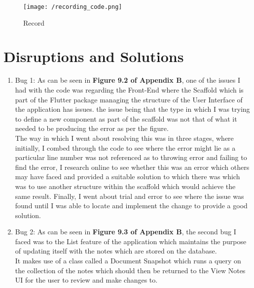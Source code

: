 \documentclass[oneside]{report}
\begin{document}
		\begin{figure}[H]
			\begin{center}
	 		 	\texttt{[image: /recording\_code.png]}
			\end{center}
			\caption[Record]{Record}
		\end{figure}


	\section{Disruptions and Solutions}
		 \begin{enumerate}
			\item Bug 1: As can be seen in \textbf{Figure 9.2 of Appendix B}, one of the issues I had with the code was regarding the Front-End where the Scaffold which is part of the Flutter package managing the structure of the User Interface of the application has issues. the issue being that the type in which I was trying to define a new component as part of the scaffold was not that of what it needed to be producing the error as per the figure.\\

The way in which I went about resolving this was in three stages, where initially, I combed through the code to see where the error might lie as a particular line number was not referenced as to throwing error and failing to find the error, I research online to see whether this was an error which others may have faced and provided a suitable solution to which there was which was to use another structure within the scaffold which would achieve the same result. Finally, I went about trial and error to see where the issue was found until I was able to locate and implement the change to provide a good solution.

		 	\item Bug 2: As can be seen in \textbf{Figure 9.3 of Appendix B}, the second bug I faced was to the List feature of the application which maintains the purpose of updating itself with the notes which are stored on the database.\\

It makes use of a class called a Document Snapshot which runs a query on the collection of the notes which should then be returned to the View Notes UI for the user to review and make changes to.\\


\end{enumerate}
\end{document}
